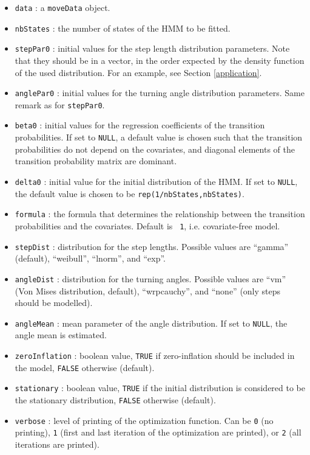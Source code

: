 \documentclass[]{article}
\begin{document}
\begin{itemize}
	\item \texttt{data} : a \texttt{moveData} object.
	\item \texttt{nbStates} : the number of states of the HMM to be fitted.
	\item \texttt{stepPar0} : initial values for the step length distribution parameters. Note that they should be in a vector, in the order expected by the density function of the used distribution. For an example, see Section \ref{application}.
	\item \texttt{anglePar0} : initial values for the turning angle distribution parameters. Same remark as for \texttt{stepPar0}.
	\item \texttt{beta0} : initial values for the regression coefficients of the transition probabilities. If set to \texttt{NULL}, a default value is chosen such that the transition probabilities do not depend on the covariates, and diagonal elements of the transition probability matrix are dominant.
	\item \texttt{delta0} : initial value for the initial distribution of the HMM. If set to \texttt{NULL}, the default value is chosen to be \texttt{rep(1/nbStates,nbStates)}.
	\item \texttt{formula} : the formula that determines the relationship between the transition probabilities and the covariates. Default is \texttt{~1}, i.e. covariate-free model.
	\item \texttt{stepDist} : distribution for the step lengths. Possible values are ``gamma'' (default), ``weibull'', ``lnorm'', and ``exp''.
	\item \texttt{angleDist} : distribution for the turning angles. Possible values are ``vm'' (Von Mises distribution, default), ``wrpcauchy'', and ``none'' (only steps should be modelled).
	\item \texttt{angleMean} : mean parameter of the angle distribution. If set to \texttt{NULL}, the angle mean is estimated.
	\item \texttt{zeroInflation} : boolean value, \texttt{TRUE} if zero-inflation should be included in the model, \texttt{FALSE} otherwise (default).
	\item \texttt{stationary} : boolean value, \texttt{TRUE} if the initial distribution is considered to be the stationary distribution, \texttt{FALSE} otherwise (default).
	\item \texttt{verbose} : level of printing of the optimization function. Can be \texttt{0} (no printing), \texttt{1} (first and last iteration of the optimization are printed), or \texttt{2} (all iterations are printed).
\end{itemize}
\end{document}
